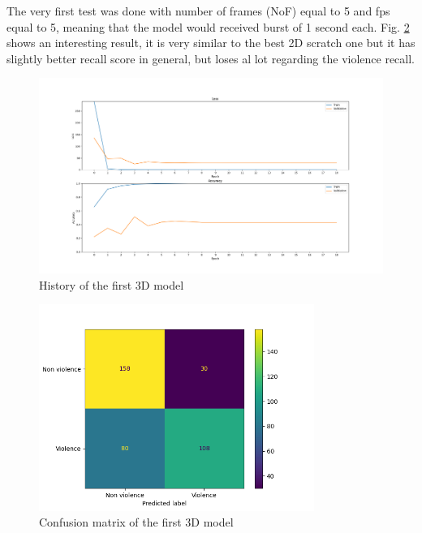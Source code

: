 The very first test was done with number of frames (NoF) equal to 5 and fps equal to 5, meaning that the model would received burst of 1 second each. Fig. \ref{fig:First3DCNNconfusionMatrix} shows an interesting result, it is very similar to the best 2D scratch one but it has slightly better recall score in general, but loses al lot regarding the violence recall.
\begin{figure}[]
    \centering
    \includegraphics[width=\textwidth]{images/7f2d-testGiacomo3D9-9fcf-history.png}
    \caption{History of the first 3D model}
    \label{fig:First3DCNNHistory}
\end{figure}

\begin{figure}[]
    \centering
    \includegraphics[width=0.8\textwidth]{images/7f2d-testGiacomo3D9-9fcf-conf_matrix.png}
    \caption{Confusion matrix of the first 3D model}
    \label{fig:First3DCNNconfusionMatrix}
\end{figure}

